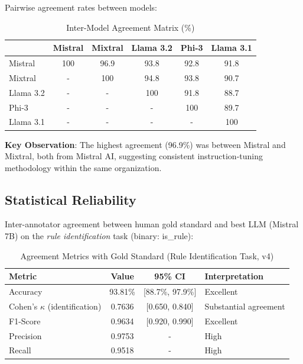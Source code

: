 Pairwise agreement rates between models:

\begin{table}[htbp]
\centering
\caption{Inter-Model Agreement Matrix (\%)}
\label{tab:agreement}
\begin{tabular}{lccccc}
\toprule
& \textbf{Mistral} & \textbf{Mixtral} & \textbf{Llama 3.2} & \textbf{Phi-3} & \textbf{Llama 3.1} \\
\midrule
Mistral & 100 & 96.9 & 93.8 & 92.8 & 91.8 \\
Mixtral & - & 100 & 94.8 & 93.8 & 90.7 \\
Llama 3.2 & - & - & 100 & 91.8 & 88.7 \\
Phi-3 & - & - & - & 100 & 89.7 \\
Llama 3.1 & - & - & - & - & 100 \\
\bottomrule
\end{tabular}
\end{table}

\textbf{Key Observation}: The highest agreement (96.9\%) was between Mistral and Mixtral, both from Mistral AI, suggesting consistent instruction-tuning methodology within the same organization.

\subsection{Statistical Reliability}

Inter-annotator agreement between human gold standard and best LLM (Mistral 7B) on the \textit{rule identification} task (binary: is\_rule):

\begin{table}[htbp]
\centering
\caption{Agreement Metrics with Gold Standard (Rule Identification Task, v4)}
\label{tab:agreement-stats}
\begin{tabular}{|l|c|c|l|}
\hline
\textbf{Metric} & \textbf{Value} & \textbf{95\% CI} & \textbf{Interpretation} \\
\hline
Accuracy & 93.81\% & [88.7\%, 97.9\%] & Excellent \\
Cohen's $\kappa$ (identification) & 0.7636 & [0.650, 0.840] & Substantial agreement \\
F1-Score & 0.9634 & [0.920, 0.990] & Excellent \\
Precision & 0.9753 & - & High \\
Recall & 0.9518 & - & High \\
\hline
\end{tabular}
\end{table}

